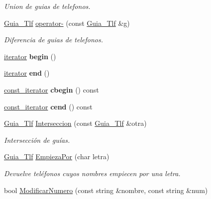 \begin{DoxyCompactItemize}
\begin{DoxyCompactList}\small\item\em Union de guias de telefonos. \end{DoxyCompactList}\item 
\hyperlink{classGuia__Tlf}{Guia\+\_\+\+Tlf} \hyperlink{classGuia__Tlf_ac381d53f275ce769830e07fbc56902b0}{operator-\/} (const \hyperlink{classGuia__Tlf}{Guia\+\_\+\+Tlf} \&g)
\begin{DoxyCompactList}\small\item\em Diferencia de guias de telefonos. \end{DoxyCompactList}\item 
\mbox{\label{classGuia__Tlf_a0a0f50f45b96349e005d7457a0c05574}} 
\hyperlink{classGuia__Tlf_1_1iterator}{iterator} {\bfseries begin} ()
\item 
\mbox{\label{classGuia__Tlf_a91777ba1c5e206259943af1eae5aa305}} 
\hyperlink{classGuia__Tlf_1_1iterator}{iterator} {\bfseries end} ()
\item 
\mbox{\label{classGuia__Tlf_a6fc1cd1e07ea139a5aec83882f73b3b4}} 
\hyperlink{classGuia__Tlf_1_1const__iterator}{const\+\_\+iterator} {\bfseries cbegin} () const
\item 
\mbox{\label{classGuia__Tlf_afd2dd5c9f44f3c5b26d2475b7d9de04c}} 
\hyperlink{classGuia__Tlf_1_1const__iterator}{const\+\_\+iterator} {\bfseries cend} () const
\item 
\hyperlink{classGuia__Tlf}{Guia\+\_\+\+Tlf} \hyperlink{classGuia__Tlf_a12d8c88bb4979bd09a6c019d9158c273}{Interseccion} (const \hyperlink{classGuia__Tlf}{Guia\+\_\+\+Tlf} \&otra)
\begin{DoxyCompactList}\small\item\em Intersección de guías. \end{DoxyCompactList}\item 
\hyperlink{classGuia__Tlf}{Guia\+\_\+\+Tlf} \hyperlink{classGuia__Tlf_a71f06ef3b7ffd29dc02153a42916d3d5}{Empieza\+Por} (char letra)
\begin{DoxyCompactList}\small\item\em Devuelve teléfonos cuyos nombres empiecen por una letra. \end{DoxyCompactList}\item 
bool \hyperlink{classGuia__Tlf_ac1388585878b7832c46b9897c9be8e02}{Modificar\+Numero} (const string \&nombre, const string \&num)

\end{DoxyCompactItemize}
